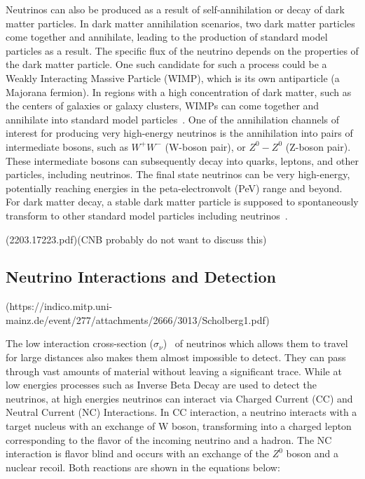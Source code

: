Neutrinos can also be produced as a result of self-annihilation or decay of dark matter particles. In dark matter annihilation scenarios, two dark matter particles come together and annihilate, leading to the production of standard model particles as a result. The specific flux of the neutrino depends on the properties of the dark matter particle. One such candidate for such a process could be a Weakly Interacting Massive Particle (WIMP), which is its own antiparticle (a Majorana fermion). In regions with a high concentration of dark matter, such as the centers of galaxies or galaxy clusters, WIMPs can come together and annihilate into standard model particles~\cite{10.1111/j.1365-2966.2008.13366.x}. One of the annihilation channels of interest for producing very high-energy neutrinos is the annihilation into pairs of intermediate bosons, such as $W^+W^-$ (W-boson pair), or $Z^0 - Z^0$ (Z-boson pair). These intermediate bosons can subsequently decay into quarks, leptons, and other particles, including neutrinos. The final state neutrinos can be very high-energy, potentially reaching energies in the peta-electronvolt (PeV) range and beyond. For dark matter decay, a stable dark matter particle is supposed to spontaneously transform to other standard model particles including neutrinos~\cite{PhysRevD.108.123021}. 

(2203.17223.pdf)(CNB probably do not want to discuss this)


\subsection{Neutrino Interactions and Detection }(https://indico.mitp.uni-mainz.de/event/277/attachments/2666/3013/Scholberg1.pdf)
\label{subsec:Nuintdet}

The low interaction cross-section ($\sigma_{\nu}$)~\cite{Formaggio_2012} of neutrinos which allows them to travel for large distances also makes them almost impossible to detect. They can pass through vast amounts of material without leaving a significant trace. While at low energies processes such as Inverse Beta Decay are used to detect the neutrinos, at high energies neutrinos can interact via Charged Current (CC) and Neutral Current (NC) Interactions. In CC interaction, a neutrino interacts with a target nucleus with an exchange of W boson, transforming into a charged lepton corresponding to the flavor of the incoming neutrino and a hadron. The NC interaction is flavor blind and occurs with an exchange of the $Z^0$ boson and a nuclear recoil. Both reactions are shown in the equations below:

